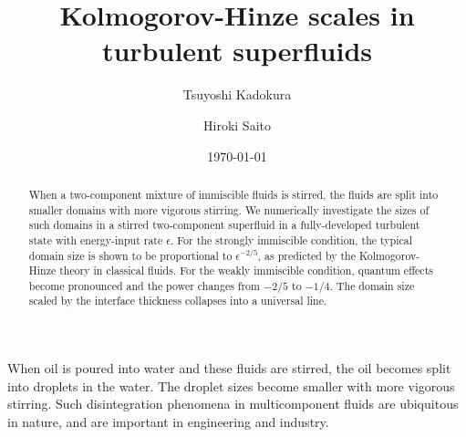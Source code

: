 \documentclass[pra,aps,superscriptaddress,twocolumn]{revtex4-2}
\begin{document}
\title{Kolmogorov-Hinze scales in turbulent superfluids}

\author{Tsuyoshi Kadokura}

\author{Hiroki Saito}

\date{\today}

\begin{abstract}
When a two-component mixture of immiscible fluids is stirred, the fluids
are split into smaller domains with more vigorous stirring.
We numerically investigate the sizes of such domains in a stirred
two-component superfluid in a fully-developed turbulent state with
energy-input rate $\epsilon$.
For the strongly immiscible condition, the typical domain size is shown to
be proportional to $\epsilon^{-2/5}$, as predicted by the Kolmogorov-Hinze
theory in classical fluids.
For the weakly immiscible condition, quantum effects become pronounced and
the power changes from $-2 / 5$ to $-1 / 4$.
The domain size scaled by the interface thickness collapses into a universal
line.
\end{abstract}

\maketitle


When oil is poured into water and these fluids are stirred, the oil becomes
split into droplets in the water.
The droplet sizes become smaller with more vigorous stirring.
Such disintegration phenomena in multicomponent fluids are ubiquitous in
nature, and are important in engineering and industry.
\end{document}
